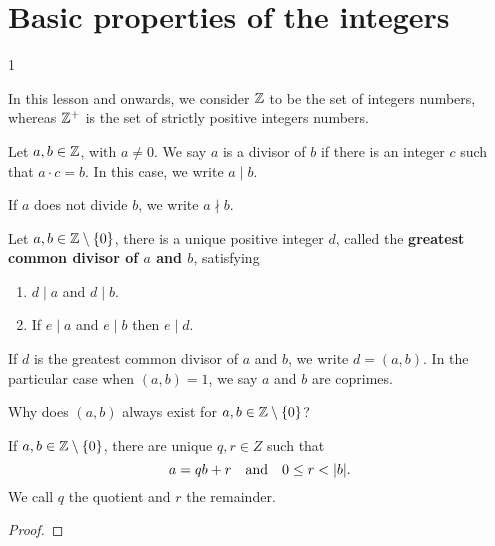 \documentclass[11pt,a4paper]{article}
\begin{document}
\def\contador{1}


\section{Basic properties of the integers}
1

In this lesson and onwards, we consider $\mathbb{Z}$ to be the set of integers numbers, whereas $\mathbb{Z}^{+}$ is the set of strictly positive integers numbers.

\begin{defi}
Let $a,b\in \mathbb{Z}$, with $a\neq 0$. We say  $a$ is a divisor of $b$ if there is an integer $c$ such that $a\cdot c=b$. In this case, we write $a\mid b.$ 
\end{defi}

\begin{rem}
    If $a$ does not divide $b$, we write $a\nmid b$.
\end{rem}

\begin{teo}
    Let $a,b\in \mathbb{Z}\setminus\{0\}$, there is a unique positive integer $d$, called the \textbf{greatest common divisor of $a$ and $b$}, satisfying 
    \begin{enumerate}
        \item $d\mid a$ and $d\mid b.$
        \item If $e\mid a$ and $e\mid b$ then $e\mid d.$
    \end{enumerate}
\end{teo}

\begin{rem}
    If $d$ is the greatest common divisor of $a$ and $b$, we write $d=(a,b).$
    In the  particular case when  $(a,b)=1$, we say  $a$ and $b$ are coprimes.
\end{rem}

\begin{que}
    Why does $(a,b)$ always exist for $a,b\in \mathbb{Z}\setminus\{0\}$?
\end{que}


\begin{teo}
    If \(a,b\in \mathbb{Z}\setminus\{0\}\), 
    there are unique \(q,r\in Z\)
    such that 
    \[a= qb +r \quad\text{and}\quad 0\leq r < |b|.\]
    We call \(q\) the quotient and \(r\) the remainder.
\end{teo}

\begin{proof}
    
\end{proof}
\end{document}
